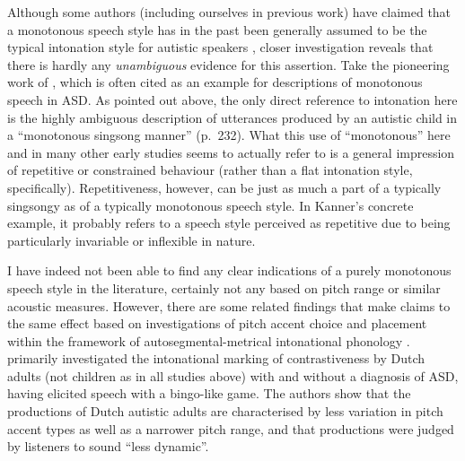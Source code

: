 \label{int_back_ASD_evidence_monotone}

Although some authors (including ourselves in previous work) have claimed that a monotonous speech style has in the past been generally assumed to be the typical intonation style for autistic speakers \citep{nadigAcousticPerceptualMeasurement2012,wehrleSomewhereSpectrumRobotic2018}, closer investigation reveals that there is hardly any \emph{unambiguous} evidence for this assertion. Take the pioneering work of \citet{kannerAutisticDisturbancesAffective1943}, which is often cited as an example for descriptions of monotonous speech in ASD. As pointed out above, the only direct reference to intonation here is the highly ambiguous description of utterances produced by an autistic child in a ``monotonous singsong manner'' (p.~232). What this use of ``monotonous'' here and in many other early studies \citep[including][]{aspergerAutistischenPsychopathenIm1944a} seems to actually refer to is a general impression of repetitive or constrained behaviour (rather than a flat intonation style, specifically). Repetitiveness, however, can be just as much a part of a typically singsongy as of a typically monotonous speech style. In Kanner's concrete example, it probably refers to a speech style perceived as repetitive due to being particularly invariable or inflexible in nature.

\hspace{-2.5pt}I have indeed not been able to find any clear indications of a purely monotonous speech style in the literature, certainly not any based on pitch range or similar acoustic measures. However, there are some related findings that make claims to the same effect based on investigations of pitch accent choice and placement within the framework of autosegmental-metrical intonational phonology \citep{laddIntonationalPhonology2008}. \citet{kalandAccountingListenerComparing2013}  primarily investigated the intonational marking of contrastiveness by Dutch adults (not children as in all studies above) with and without a diagnosis of ASD, having elicited speech with a bingo-like game. The authors show that the productions of Dutch autistic adults are characterised by less variation in pitch accent types as well as a narrower pitch range, and that productions were judged by listeners to sound ``less dynamic''.

